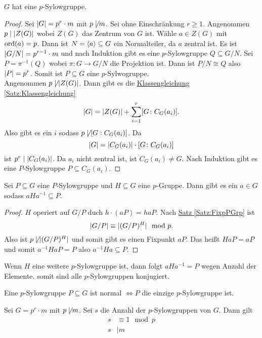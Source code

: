 \begin{Satz}[1. Sylowsatz]
    \(G\) hat eine \(p\)-Sylowgruppe.
\end{Satz}
\begin{proof}
    Sei \(\lvert G\rvert=p^r\cdot m\) mit \(p\not\mid m\).
    Sei ohne Einschränkung \(r\geq 1\).
    Angenommen \(p\mid \lvert Z(G)\rvert\) wobei \(Z(G)\) das Zentrum von \(G\) ist. Wähle \(a\in Z(G)\) mit \(\operatorname{ord}(a)=p\). Dann ist \(N=\langle a\rangle\subseteq G\) ein Normalteiler, da \(a\) zentral ist. Es ist \(\lvert G/N\rvert=p^{r-1}\cdot m\) und nach Induktion gibt es eine \(p\)-Sylowgruppe \(Q\subseteq G/N\). Sei \(P=\pi^{-1}(Q)\) wobei \(\pi\colon G\to G/N\) die Projektion ist.
    Dann ist \(P/N\cong Q\) also \(\lvert P\rvert=p^r\). Somit ist \(P\subseteq G\) eine \(p\)-Sylwogruppe.\\
    Angenommen \(p\not\mid \lvert Z(G)\rvert\). Dann gibt es die \hyperref[Satz:Klassengleichung]{Klassengleichung \ref{Satz:Klassengleichung}}
    \[\lvert G\rvert=\lvert Z(G)\rvert+\sum_{i=1}^r[G\colon C_G(a_i)].\]
    Also gibt es ein \(i\) sodass \(p\not\mid [G:C_G(a_i)]\).
    Da \[\lvert G\rvert=\lvert C_G(a_i)\rvert\cdot [G\colon C_G(a_i)]\] ist \(p^r\mid\lvert C_G(a_i)\rvert\). Da \(a_i\) nicht zentral ist, ist \(C_G(a_i)\neq G\). Nach Induktion gibt es eine \(P\)-Sylowgruppe \(P\subseteq C_G(a_i)\).
\end{proof} 
\begin{Satz}[2. Sylowsatz]\label{Satz:2Sylow}
Sei \(P\subseteq G\) eine \(P\)-Sylowgruppe und \(H\subseteq G\) eine \(p\)-Gruppe. Dann gibt es ein \(a\in G\) sodass \(aHa^{-1}\subseteq P\).    
\end{Satz}
\begin{proof}
    \(H\) operiert auf \(G/P\) duch \(h\cdot (aP)=haP\). Nach \hyperref[Satz:FixpPGrp]{Satz \ref{Satz:FixpPGrp}} ist 
    \[\lvert G/P\rvert\equiv \lvert(G/P)^H\rvert\mod p.\]
    Also ist \(p\not\mid \lvert(G/P)^H\rvert\) und somit gibt es einen Fixpunkt \(aP\). Das heißt \(HaP=aP\) und somit \(a^{-1}HaP=P\) also \(a^{-1}Ha\subseteq P\).
\end{proof}
\begin{Kor}
    Wenn \(H\) eine weitere \(p\)-Sylowgruppe ist, dann folgt \(aHa^{-1}=P\) wegen Anzahl der Elemente. somit sind alle \(p\)-Sylowgruppen konjugiert.
\end{Kor}
\begin{Bem}
    Eine \(p\)-Sylowgruppe \(P\subseteq G\) ist normal \(\iff P\) die einzige \(p\)-Sylowgruppe ist.
\end{Bem}
\begin{Satz}[3. Sylowsatz]\label{Satz:3Sylow}
    Sei \(G=p^r\cdot m\) mit \(p\not \mid m\). Sei \(s\) die Anzahl der \(p\)-Sylowgruppen von \(G\). Dann gilt
    \begin{align}
        s&\equiv 1\mod p\\
        s&\mid m
    \end{align}
\end{Satz}
